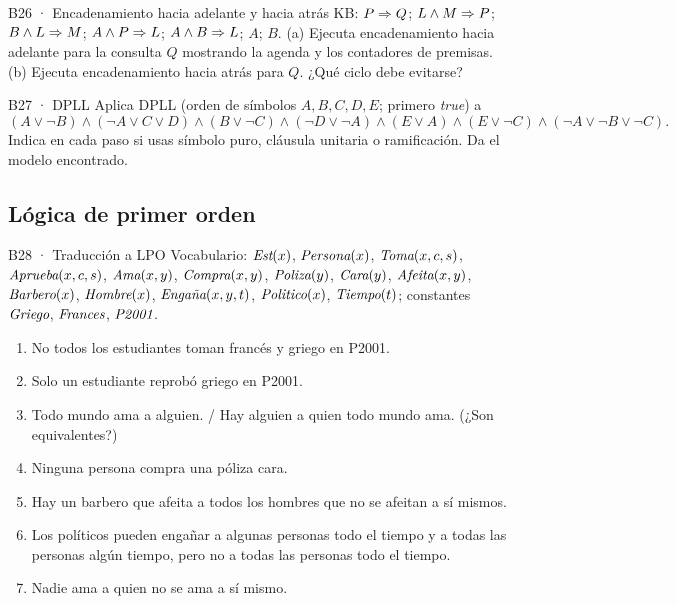 \begin{ejercicio}{B26 · Encadenamiento hacia adelante y hacia atrás }
KB: $P\Rightarrow Q$;\; $L\wedge M\Rightarrow P$;\; $B\wedge L\Rightarrow M$;\; $A\wedge P\Rightarrow L$;\; $A\wedge B\Rightarrow L$;\; $A$;\; $B$.
(a) Ejecuta encadenamiento hacia adelante para la consulta $Q$ mostrando la agenda y los contadores
de premisas. (b) Ejecuta encadenamiento hacia atrás para $Q$. ¿Qué ciclo debe evitarse?
\end{ejercicio}

\begin{ejercicio}{B27 · DPLL }
Aplica DPLL (orden de símbolos $A,B,C,D,E$; primero \textit{true}) a
\[(A\vee\neg B)\wedge(\neg A\vee C\vee D)\wedge(B\vee\neg C)\wedge(\neg D\vee\neg A)\wedge(E\vee A)\wedge(E\vee\neg C)\wedge(\neg A\vee\neg B\vee\neg C).\]
Indica en cada paso si usas símbolo puro, cláusula unitaria o ramificación. Da el modelo encontrado.
\end{ejercicio}

\subsection{Lógica de primer orden}

\begin{ejercicio}{B28 · Traducción a LPO }
Vocabulario: $\textit{Est}(x)$, $\textit{Persona}(x)$, $\textit{Toma}(x,c,s)$, $\textit{Aprueba}(x,c,s)$, $\textit{Ama}(x,y)$,
$\textit{Compra}(x,y)$, $\textit{Poliza}(y)$, $\textit{Cara}(y)$, $\textit{Afeita}(x,y)$, $\textit{Barbero}(x)$, $\textit{Hombre}(x)$,
$\textit{Engaña}(x,y,t)$, $\textit{Politico}(x)$, $\textit{Tiempo}(t)$; constantes $\textit{Griego}$, $\textit{Frances}$, $\textit{P2001}$.
\begin{enumerate}[label=(\alph*)]
\item No todos los estudiantes toman francés y griego en P2001.
\item Solo un estudiante reprobó griego en P2001.
\item Todo mundo ama a alguien. / Hay alguien a quien todo mundo ama. (¿Son equivalentes?)
\item Ninguna persona compra una póliza cara.
\item Hay un barbero que afeita a todos los hombres que no se afeitan a sí mismos.
\item Los políticos pueden engañar a algunas personas todo el tiempo y a todas las personas algún
tiempo, pero no a todas las personas todo el tiempo.
\item Nadie ama a quien no se ama a sí mismo.
\end{enumerate}
\end{ejercicio}


